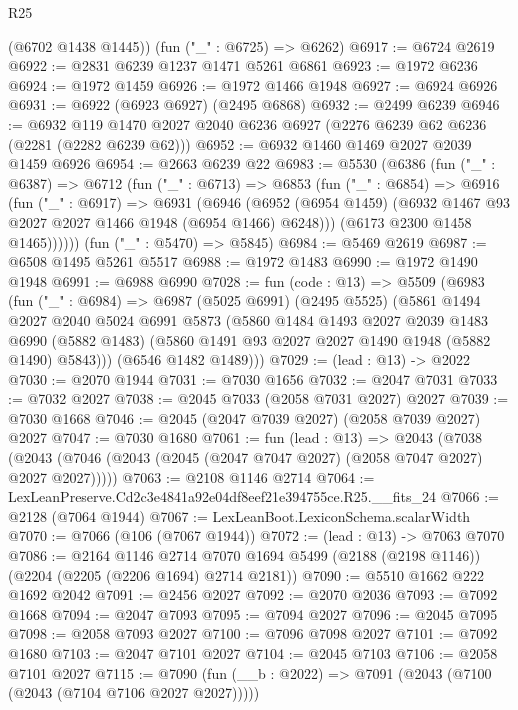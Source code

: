 \begin{lexlean}{R25}
\begin{coremodule}
      (@6702 @1438 @1445))
    (fun ("_" : @6725) => @6262)
@6917 := @6724 @2619
@6922 := @2831 @6239 @1237 @1471 @5261 @6861
@6923 := @1972 @6236
@6924 := @1972 @1459
@6926 := @1972 @1466 @1948
@6927 := @6924 @6926
@6931 := @6922 (@6923 @6927) (@2495 @6868)
@6932 := @2499 @6239
@6946 := @6932 @119 @1470 @2027 @2040 @6236 @6927 (@2276 @6239 @62 @6236 (@2281 (@2282 @6239 @62)))
@6952 := @6932 @1460 @1469 @2027 @2039 @1459 @6926
@6954 := @2663 @6239 @22
@6983 := @5530
    (@6386
      (fun ("_" : @6387) =>
      @6712
        (fun ("_" : @6713) =>
        @6853
          (fun ("_" : @6854) =>
          @6916
            (fun ("_" : @6917) =>
            @6931
              (@6946
                (@6952 (@6954 @1459) (@6932 @1467 @93 @2027 @2027 @1466 @1948 (@6954 @1466) @6248)))
              (@6173 @2300 @1458 @1465))))))
    (fun ("_" : @5470) => @5845)
@6984 := @5469 @2619
@6987 := @6508 @1495 @5261 @5517
@6988 := @1972 @1483
@6990 := @1972 @1490 @1948
@6991 := @6988 @6990
@7028 := fun (code : @13) =>
  @5509
    (@6983
      (fun ("_" : @6984) =>
      @6987
        (@5025 @6991)
        (@2495 @5525)
        (@5861
          @1494
          @2027
          @2040
          @5024
          @6991
          @5873
          (@5860
            @1484
            @1493
            @2027
            @2039
            @1483
            @6990
            (@5882 @1483)
            (@5860 @1491 @93 @2027 @2027 @1490 @1948 (@5882 @1490) @5843)))
        (@6546 @1482 @1489)))
@7029 := (lead : @13) -> @2022
@7030 := @2070 @1944
@7031 := @7030 @1656
@7032 := @2047 @7031
@7033 := @7032 @2027
@7038 := @2045 @7033 (@2058 @7031 @2027) @2027
@7039 := @7030 @1668
@7046 := @2045 (@2047 @7039 @2027) (@2058 @7039 @2027) @2027
@7047 := @7030 @1680
@7061 := fun (lead : @13) =>
  @2043 (@7038 (@2043 (@7046 (@2043 (@2045 (@2047 @7047 @2027) (@2058 @7047 @2027) @2027 @2027)))))
@7063 := @2108 @1146 @2714
@7064 := LexLeanPreserve.Cd2c3e4841a92e04df8eef21e394755ce.R25.__fits_24
@7066 := @2128 (@7064 @1944)
@7067 := LexLeanBoot.LexiconSchema.scalarWidth
@7070 := @7066 (@106 (@7067 @1944))
@7072 := (lead : @13) -> @7063 @7070
@7086 := @2164
    @1146
    @2714
    @7070
    @1694
    @5499
    (@2188 (@2198 @1146))
    (@2204 (@2205 (@2206 @1694) @2714 @2181))
@7090 := @5510 @1662 @222 @1692 @2042
@7091 := @2456 @2027
@7092 := @2070 @2036
@7093 := @7092 @1668
@7094 := @2047 @7093
@7095 := @7094 @2027
@7096 := @2045 @7095
@7098 := @2058 @7093 @2027
@7100 := @7096 @7098 @2027
@7101 := @7092 @1680
@7103 := @2047 @7101 @2027
@7104 := @2045 @7103
@7106 := @2058 @7101 @2027
@7115 := @7090 (fun (__b : @2022) => @7091 (@2043 (@7100 (@2043 (@7104 @7106 @2027 @2027)))))

\end{coremodule}
\end{lexlean}

